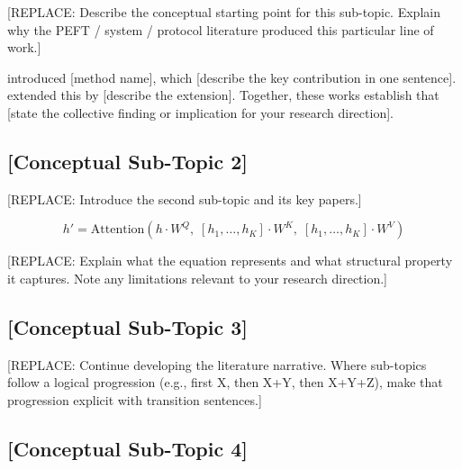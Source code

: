 [REPLACE: Describe the conceptual starting point for this sub-topic.
Explain why the PEFT / system / protocol literature produced this particular
line of work.]

\citet{ExamplePaper2020} introduced [method name], which [describe the key
contribution in one sentence]. \citet{ExamplePaper2021} extended this by
[describe the extension]. Together, these works establish that [state the
collective finding or implication for your research direction].

\subsection{[Conceptual Sub-Topic 2]}
\label{sec:lit_cluster_N:subtopic2}


[REPLACE: Introduce the second sub-topic and its key papers.]

\begin{equation}
  h' = \mathrm{Attention}(h \cdot W^Q,\; [h_1,\ldots,h_K] \cdot W^K,\;
                           [h_1,\ldots,h_K] \cdot W^V)
  \label{eq:cluster_N_example}
\end{equation}

[REPLACE: Explain what the equation represents and what structural property it
captures. Note any limitations relevant to your research direction.]

\subsection{[Conceptual Sub-Topic 3]}
\label{sec:lit_cluster_N:subtopic3}

[REPLACE: Continue developing the literature narrative. Where sub-topics follow
a logical progression (e.g., first X, then X+Y, then X+Y+Z), make that
progression explicit with transition sentences.]

\subsection{[Conceptual Sub-Topic 4]}
\label{sec:lit_cluster_N:subtopic4}

